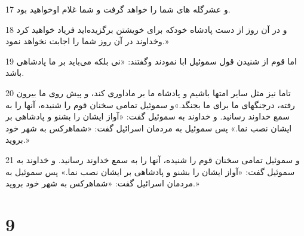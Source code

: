 \par 17 و عشرگله های شما را خواهد گرفت و شما غلام اوخواهید بود.
\par 18 و در آن روز از دست پادشاه خودکه برای خویشتن برگزیده‌اید فریاد خواهید کرد وخداوند در آن روز شما را اجابت نخواهد نمود.»
\par 19 اما قوم از شنیدن قول سموئیل ابا نمودند وگفتند: «نی بلکه می‌باید بر ما پادشاهی باشد.
\par 20 تاما نیز مثل سایر امتها باشیم و پادشاه ما بر ماداوری کند، و پیش روی ما بیرون رفته، درجنگهای ما برای ما بجنگد.»و سموئیل تمامی سخنان قوم را شنیده، آنها را به سمع خداوند رسانید. و خداوند به سموئیل گفت: «آواز ایشان را بشنو و پادشاهی بر ایشان نصب نما.» پس سموئیل به مردمان اسرائیل گفت: «شماهرکس به شهر خود بروید.»
\par 21 و سموئیل تمامی سخنان قوم را شنیده، آنها را به سمع خداوند رسانید. و خداوند به سموئیل گفت: «آواز ایشان را بشنو و پادشاهی بر ایشان نصب نما.» پس سموئیل به مردمان اسرائیل گفت: «شماهرکس به شهر خود بروید.»
 
\chapter{9}

